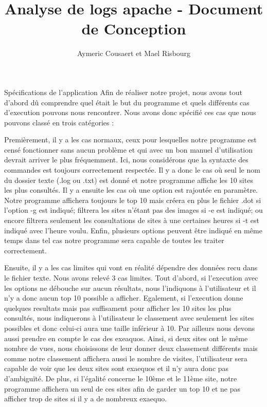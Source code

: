 \documentclass{article}
\date{}
\title{Analyse de logs apache - Document de Conception}
\author{Aymeric Cousaert et Mael Risbourg}
\begin{document}
\maketitle

\vspace{1cm}
\tableofcontents
\vspace{1cm}

\begin{section}{Spécifications de l'application}
Afin de réaliser notre projet, nous avons tout d'abord dû comprendre quel était le but du programme et quels différents cas d'execution pouvons nous rencontrer. Nous avons donc spécifié ces cas  que nous pouvons classé en trois catégories :

Premièrement, il y a les cas normaux, ceux pour lesquelles notre programme est censé fonctionner sans aucun problème et qui avec un bon manuel d'utilisation devrait arriver le plus fréquemment. Ici, nous considérons que la syntaxte des commandes est toujours correctement respectée. Il y a donc le cas où seul le nom du dossier texte (.log ou .txt) est donné et notre programme affiche les 10 sites les plus consultés. Il y a ensuite les cas où une option est rajoutée en paramètre. Notre programme affichera toujours le top 10 mais créera en plus le fichier .dot si l'option -g est indiqué; filtrera les sites n'étant pas des images si -e est indiqué; ou encore filtrera seulement les consultations de sites à une certaines heures si -t est indiqué avec l'heure voulu. Enfin, plusieurs options peuvent être indiqué en même temps dans tel cas notre programme sera capable de toutes les traiter correctement.

Ensuite, il y a les cas limites qui vont en réalité dépendre des données recu dans le fichier texte. Nous avons relevé 3 cas limites. Tout d'abord, si l'execution avec les options ne débouche sur aucun résultats, nous l'indiquons à l'utilisateur et il n'y a donc aucun top 10 possible a afficher. Egalement, si l'execution donne quelques resultats mais pas suffisament pour afficher les 10 sites les plus consultés, nous indiquerons à l'utilisateur le classement avec seulement les sites possibles et donc celui-ci aura une taille inférieur à 10. Par ailleurs nous devons aussi prendre en compte le cas des exeaquos. Ainsi, si deux sites ont le même nombre de vues, nous choisissons de leur donner deux classement différents mais comme notre classement affichera aussi le nombre de visites, l'utilisateur sera capable de voir que les deux sites sont exaequos et il n'y aura donc pas d'ambiguïté. De plus, si l'égalité concerne le 10ème et le 11ème site, notre programme affichera un seul de ces sites afin de garder un top 10 et ne pas afficher trop de sites si il y a de nombreux exaequo.
\end{section}
\end{document}
